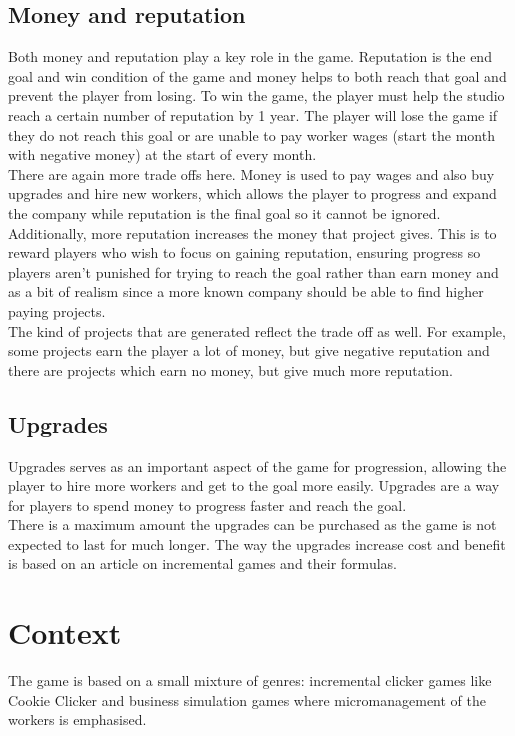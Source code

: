 \documentclass[11pt]{article}
\newcommand{\n}[0]{\\[\baselineskip]}
\begin{document}
\subsection{Money and reputation}
Both money and reputation play a key role in the game. Reputation is the end goal and win condition of the game and money helps to both reach that goal and prevent the player from losing. To win the game, the player must help the studio reach a certain number of reputation by 1 year. The player will lose the game if they do not reach this goal or are unable to pay worker wages (start the month with negative money) at the start of every month. 
\n
There are again more trade offs here. Money is used to pay wages and also buy upgrades and hire new workers, which allows the player to progress and expand the company while reputation is the final goal so it cannot be ignored. Additionally, more reputation increases the money that project gives. This is to reward players who wish to focus on gaining reputation, ensuring progress so players aren't punished for trying to reach the goal rather than earn money and as a bit of realism since a more known company should be able to find higher paying projects. 
\n
The kind of projects that are generated reflect the trade off as well. For example, some projects earn the player a lot of money, but give negative reputation and there are projects which earn no money, but give much more reputation. 


\subsection{Upgrades}
Upgrades serves as an important aspect of the game for progression, allowing the player to hire more workers and get to the goal more easily. Upgrades are a way for players to spend money to progress faster and reach the goal. 
\n
There is a maximum amount the upgrades can be purchased as the game is not expected to last for much longer. The way the upgrades increase cost and benefit is based on an article \cite{upgrades} on incremental games and their formulas.


\section{Context}
The game is based on a small mixture of genres: incremental clicker games like Cookie Clicker \cite{cookie} and business simulation games where micromanagement of the workers is emphasised.
\end{document}
